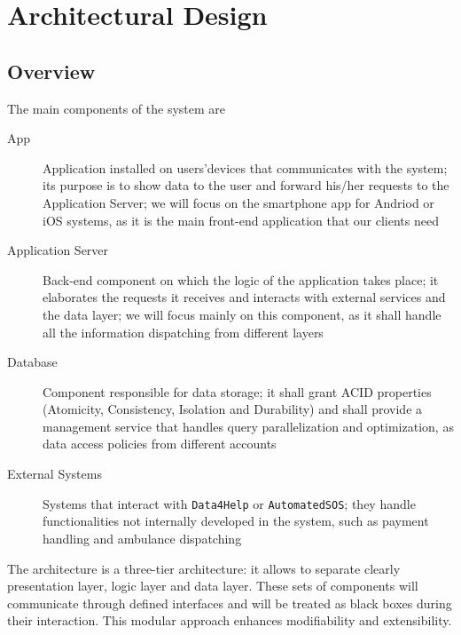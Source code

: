 \documentclass[../DD0.tex]{subfiles}
\begin{document}
\def \AccountManager {\texttt{AccountManager}}
\def \DataCollector {\texttt{DataCollector}}
\def \EmergencyDetector {\texttt{EmergencyDetector}}
\def \PaymentGateway {\texttt{PaymentGateway}}
\def \NotificationManager {\texttt{NotificationManager}}
\def \EmergencyDispatcher {\texttt{EmergencyDispatcher}}
\def \FilterManager {\texttt{FilterManager}}
\def \RequestManager {\texttt{RequestManager}}
\def \SetBuilder {\texttt{SetBuilder}}

\section{Architectural Design}
\label{sec:arcdes}

  \subsection{Overview}
  \label{sec:overview}

    The main components of the system are
    \begin{description}
      \item[App] Application installed on users'devices that communicates with the system; its purpose is to show data to the user and forward his/her requests to the Application Server; we will focus on the smartphone app for Andriod or iOS systems, as it is the main front-end application that our clients need
      \item[Application Server] Back-end component on which the logic of the application takes place; it elaborates the requests it receives and interacts with external services and the data layer; we will focus mainly on this component, as it shall handle all the information dispatching from different layers
      \item[Database] Component responsible for data storage; it shall grant ACID properties (Atomicity, Consistency, Isolation and Durability) and shall provide a management service that handles query parallelization and optimization, as data access policies from different accounts
      \item[External Systems] Systems that interact with \texttt{Data4Help} or \texttt{AutomatedSOS}; they handle functionalities not internally developed in the system, such as payment handling and ambulance dispatching
    \end{description}

    The architecture is a three-tier architecture: it allows to separate clearly presentation layer, logic layer and data layer. These sets of components will communicate through defined interfaces and will be treated as black boxes during their interaction. This modular approach enhances modifiability and extensibility.
\end{document}
